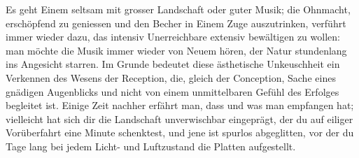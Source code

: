 Es geht Einem seltsam mit grosser Landschaft oder guter Musik; die Ohnmacht, erschöpfend zu geniessen und den Becher in Einem Zuge auszutrinken, verführt immer wieder dazu, das intensiv Unerreichbare extensiv bewältigen zu wollen: man möchte die Musik immer wieder von Neuem hören, der Natur stundenlang ins Angesicht starren. Im Grunde bedeutet diese ästhetische Unkeuschheit ein Verkennen des Wesens der Reception, die, gleich der Conception, Sache eines gnädigen Augenblicks und nicht von einem unmittelbaren Gefühl des Erfolges begleitet ist. Einige Zeit nachher erfährt man, dass und was man empfangen hat; vielleicht hat sich dir die Landschaft unverwischbar eingeprägt, der du auf eiliger Vorüberfahrt eine Minute schenktest, und jene ist spurlos abgeglitten, vor der du Tage lang bei jedem Licht- und Luftzustand die Platten aufgestellt.
\par

